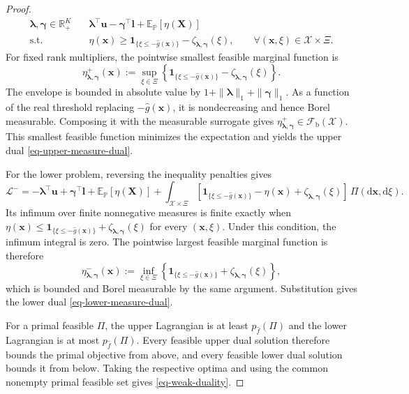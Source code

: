 \documentclass[review,11pt,3p,authoryear,nopreprintline]{elsarticle}
\begin{document}
\begin{proof}
\begin{equation*}
\begin{aligned}
{{      \bm\lambda,\bm\gamma\in\mathbb R_+^K}}
      \quad &\bm\lambda^\top\bm u-\bm\gamma^\top\bm l+\mathbb E_{\mathbb P}\left[\eta(\bm X)\right]\\
      \text{s.t.}\quad & \eta(\bm x)\ge
      \mathbf1_{\{\xi\le-\hat g(\bm x)\}}
      -\zeta_{\bm\lambda,\bm\gamma}(\xi),
      \qquad\forall(\bm x,\xi)\in\mathcal X\times\Xi.
    \end{aligned}
  \end{equation*}
  For fixed rank multipliers, the pointwise smallest feasible marginal function is
  \begin{equation*}
    \eta^+_{\bm\lambda,\bm\gamma}(\bm x)
    :=\sup_{\xi\in\Xi}\left\{
      \mathbf1_{\{\xi\le-\hat g(\bm x)\}}
      -\zeta_{\bm\lambda,\bm\gamma}(\xi)
    \right\}.
  \end{equation*}
  The envelope is bounded in absolute value by $1+\|\bm\lambda\|_1+\|\bm\gamma\|_1$. As a function of the real threshold replacing $-\hat g(\bm x)$, it is nondecreasing and hence Borel measurable. Composing it with the measurable surrogate gives $\eta^+_{\bm\lambda,\bm\gamma}\in\mathcal F_{\mathrm b}(\mathcal X)$. This smallest feasible function minimizes the expectation and yields the upper dual \eqref{eq-upper-measure-dual}.

  For the lower problem, reversing the inequality penalties gives
  \begin{equation*}
    \mathcal L^-
    =-\bm\lambda^\top\bm u+\bm\gamma^\top\bm l
      +\mathbb E_{\mathbb P}\left[\eta(\bm X)\right]
      +\int_{\mathcal X\times\Xi}\left[
        \mathbf1_{\{\xi\le-\hat g(\bm x)\}}-\eta(\bm x)+\zeta_{\bm\lambda,\bm\gamma}(\xi)
      \right]\,\Pi(\mathrm d\bm x,\mathrm d\xi).
  \end{equation*}
  Its infimum over finite nonnegative measures is finite exactly when $\eta(\bm x)\le\mathbf1_{\{\xi\le-\hat g(\bm x)\}}+\zeta_{\bm\lambda,\bm\gamma}(\xi)$ for every $(\bm x,\xi)$. Under this condition, the infimum integral is zero. The pointwise largest feasible marginal function is therefore
  \begin{equation*}
    \eta^-_{\bm\lambda,\bm\gamma}(\bm x)
    :=\inf_{\xi\in\Xi}\left\{
      \mathbf1_{\{\xi\le-\hat g(\bm x)\}}
      +\zeta_{\bm\lambda,\bm\gamma}(\xi)
    \right\},
  \end{equation*}
  which is bounded and Borel measurable by the same argument. Substitution gives the lower dual \eqref{eq-lower-measure-dual}.

  For a primal feasible $\Pi$, the upper Lagrangian is at least $p_{\hat f}(\Pi)$ and the lower Lagrangian is at most $p_{\hat f}(\Pi)$. Every feasible upper dual solution therefore bounds the primal objective from above, and every feasible lower dual solution bounds it from below. Taking the respective optima and using the common nonempty primal feasible set gives \eqref{eq-weak-duality}.
\end{proof}
\end{document}
